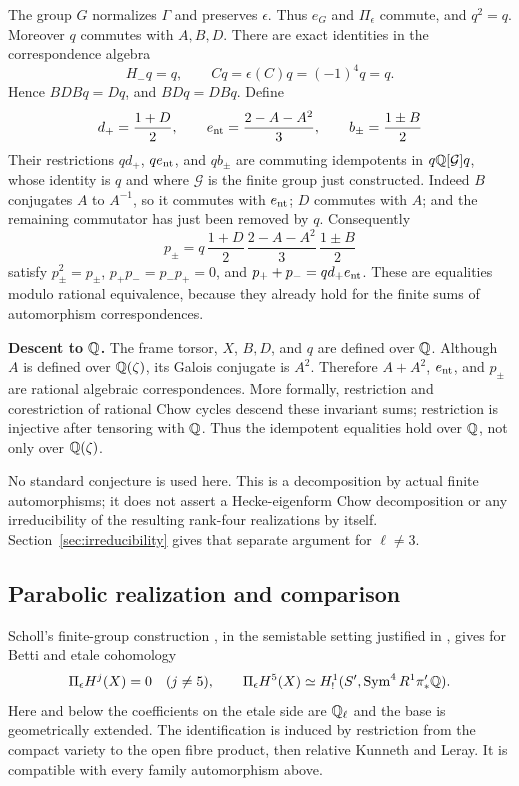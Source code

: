 The group $G$ normalizes $\Gamma$ and preserves $\epsilon$. Thus $e_G$ and
$\Pi_\epsilon$ commute, and $q^2=q$. Moreover $q$ commutes with $A,B,D$.
There are exact identities in the correspondence algebra
\[
H_-q=q,\qquad Cq=\epsilon(C)q=(-1)^4q=q.
\]
Hence $BDBq=Dq$, and $BDq=DBq$. Define
\[
d_+=\frac{1+D}{2},\qquad e_{\mathrm{nt}}=\frac{2-A-A^2}{3},\qquad
b_\pm=\frac{1\pm B}{2}
\]
Their restrictions $qd_+$, $qe_{\mathrm{nt}}$, and $qb_\pm$ are commuting idempotents
in $q\mathbb Q[\mathcal G]q$, whose identity is $q$ and where $\mathcal G$ is the
finite group just constructed. Indeed $B$ conjugates $A$ to $A^{-1}$, so it
commutes with $e_{\mathrm{nt}}$; $D$ commutes with $A$; and the remaining commutator
has just been removed by $q$. Consequently
\[
\boxed{p_\pm=q\,\frac{1+D}{2}\,\frac{2-A-A^2}{3}\,\frac{1\pm B}{2}}
\]
satisfy $p_\pm^2=p_\pm$, $p_+p_-=p_-p_+=0$, and
$p_++p_-=qd_+e_{\mathrm{nt}}$. These are equalities modulo rational equivalence,
because they already hold for the finite sums of automorphism correspondences.

\textbf{Descent to $\mathbb Q$.} The frame torsor, $X$, $B,D$, and $q$ are defined
over $\mathbb Q$. Although $A$ is defined over $\mathbb Q(\zeta)$, its Galois conjugate
is $A^2$. Therefore $A+A^2$, $e_{\mathrm{nt}}$, and $p_\pm$ are rational algebraic
correspondences. More formally, restriction and corestriction of rational Chow
cycles descend these invariant sums; restriction is injective after tensoring
with $\mathbb Q$. Thus the idempotent equalities hold over $\mathbb Q$, not only over
$\mathbb Q(\zeta)$.

No standard conjecture is used here. This is a decomposition by actual finite
automorphisms; it does not assert a Hecke-eigenform Chow decomposition or any
irreducibility of the resulting rank-four realizations by itself.
Section~\ref{sec:irreducibility} gives that separate argument for $\ell\ne3$.


\subsection{Parabolic realization and comparison}
Scholl's finite-group construction \cite[Theorem~1.2.1]{SchollMotives}, in the semistable
setting justified in \cite[Sections~2.7--2.12]{SchollVanishing}, gives for Betti and etale cohomology
\[
\Pi_\epsilon H^j(X)=0\quad(j\ne5),\qquad
\Pi_\epsilon H^5(X)\simeq
H^1_!(S',\operatorname{Sym}^4 R^1\pi'_*\mathbb Q).
\]
Here and below the coefficients on the etale side are $\mathbb Q_\ell$ and the
base is geometrically extended. The identification is induced by restriction
from the compact variety to the open fibre product, then relative Kunneth
and Leray. It is compatible with every family automorphism above.

